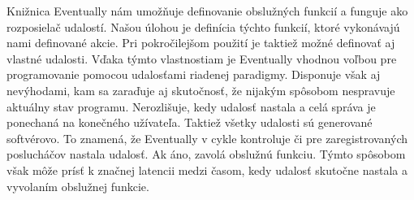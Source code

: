 \par Knižnica Eventually nám umožňuje definovanie obslužných funkcií a funguje ako rozposielač udalostí. Našou úlohou je definícia týchto funkcií, ktoré vykonávajú nami definované akcie.
Pri pokročilejšom použití je taktiež možné definovať aj vlastné udalosti. Vďaka týmto
vlastnostiam je Eventually vhodnou voľbou pre programovanie pomocou udalosťami riadenej
paradigmy. Disponuje však aj nevýhodami, kam sa zaraďuje aj skutočnosť, že nijakým spôsobom nespravuje aktuálny stav programu. Nerozlišuje, kedy udalosť nastala a
celá správa je ponechaná na konečného užívateľa. Taktiež všetky udalosti sú generované softvérovo. To znamená, že Eventually v cykle kontroluje či pre zaregistrovaných poslucháčov nastala udalosť.
Ak áno, zavolá obslužnú funkciu. Týmto spôsobom však môže prísť k značnej latencii medzi časom, kedy udalosť skutočne nastala a vyvolaním obslužnej funkcie.